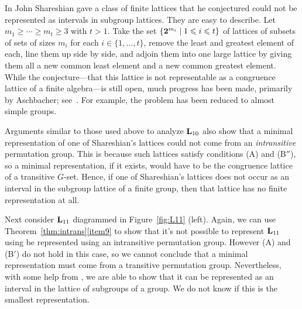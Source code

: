 In \cite{Shareshian2003} John Shareshian gave a class of finite lattices that
he conjectured could not be represented as intervals in subgroup lattices.
They are easy to describe. Let $m_1 \ge \cdots \ge m_t \ge 3$ with $t> 1$.
Take the set $\{\mathbf{2}^{m_i} \mid 1\leqslant i \leqslant t\}$ of 
lattices of subsets of sets of sizes $m_i$ for each $i\in \{1,\ldots,t\}$, remove
the least and greatest element of each, line them up side by side, and adjoin
them into one large lattice by giving them all a new common least element and a
new common greatest element. While the conjecture---that this lattice is not
representable as a congruence lattice of a finite algebra---is still open, much
progress has been made, primarily by Aschbacher; see~\cite{Aschbacher2013}.
For example, the problem has been reduced to almost simple groups.


Arguments similar to those used above to analyze $\mathbf{L}_{10}$
also show that a minimal representation of one of Shareshian's
lattices could not come from an \emph{intransitive} permutation group.
This is because such lattices satisfy conditions (A) and (B$''$),
so a minimal representation, if it exists, would have to be
the congruence lattice of a transitive $G$-set.
Hence, if one of Shareshian's lattices does not occur as an
interval in the subgroup lattice of a finite group, then that lattice has
no finite representation at all.



Next consider $\mathbf{L}_{11}$ diagrammed in Figure~\ref{fig:L11} (left). Again, we
can use Theorem~\ref{thm:intrans}\eqref{item9} to show that it's not possible to
represent $\mathbf{L}_{11}$ using be represented using an intransitive permutation group. However (A) and
(B$'$) do not hold in this case, so we cannot conclude that a minimal representation
must come from a transitive permutation group. Nevertheless, with some help from
\gap, we are able to show that it can be represented as an interval
in the lattice of subgroups of a group. We do not know if this is the
smallest representation.


